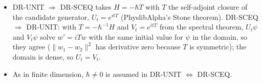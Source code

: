 \documentclass[11pt]{article}
\begin{document}
\begin{itemize}
  $(a,u,\varepsilon)$. With $\Phi(x) = \int_0^\varepsilon\theta(x,c)\,dc$ and
  $K(x) = \int_0^x\theta(u,\varepsilon)\,du$ this gives
  $\varepsilon\theta(a,b) = \Phi(a) + \Phi(b) - \Phi(a+b) + K(a+b) - K(a) - K(b)$, so
  $f = (\Phi - K)/\varepsilon$. The interval may be one-sided, which the lift needs, since $U_t$ is
  given only for $t \ge 0$.
\item DR-UNIT $\Rightarrow$ DR-SCEQ takes $H = -\hbar T$ with $T$ the self-adjoint closure of the
  candidate generator, $U_t = e^{itT}$ (PhyslibAlpha's Stone theorem). DR-SCEQ $\Rightarrow$
  DR-UNIT: with $T = -\hbar^{-1}H$ and $V_t = e^{itT}$ from the spectral theorem, $U_t\psi$ and
  $V_t\psi$ solve $w' = iTw$ with the same initial value for $\psi$ in the domain, so they agree
  ($\|w_1 - w_2\|^2$ has derivative zero because $T$ is symmetric); the domain is dense, so
  $U_t = V_t$.
\item As in finite dimension, $\hbar \ne 0$ is assumed in DR-UNIT $\Leftrightarrow$ DR-SCEQ.
\end{itemize}
\end{document}
